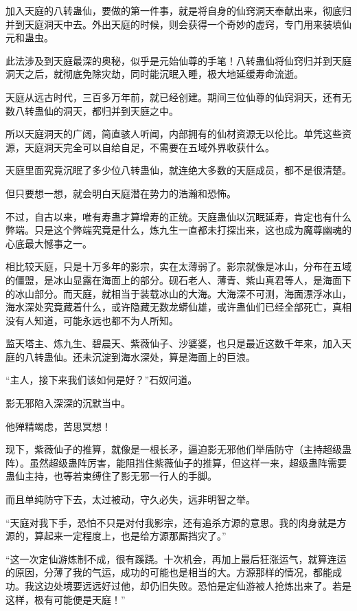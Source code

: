 \begin{this_body}
加入天庭的八转蛊仙，要做的第一件事，就是将自身的仙窍洞天奉献出来，彻底归并到天庭洞天中去。外出天庭的时候，则会获得一个奇妙的虚窍，专门用来装填仙元和蛊虫。

此法涉及到天庭最深的奥秘，似乎是元始仙尊的手笔！八转蛊仙将仙窍归并到天庭洞天之后，就彻底免除灾劫，同时能沉眠入睡，极大地延缓寿命流逝。

天庭从远古时代，三百多万年前，就已经创建。期间三位仙尊的仙窍洞天，还有无数八转蛊仙的洞天，都归并到天庭之中。

所以天庭洞天的广阔，简直骇人听闻，内部拥有的仙材资源无以伦比。单凭这些资源，天庭洞天完全可以自给自足，不需要在五域外界收获什么。

天庭里面究竟沉眠了多少位八转蛊仙，就连绝大多数的天庭成员，都不是很清楚。

但只要想一想，就会明白天庭潜在势力的浩瀚和恐怖。

不过，自古以来，唯有寿蛊才算增寿的正统。天庭蛊仙以沉眠延寿，肯定也有什么弊端。只是这个弊端究竟是什么，炼九生一直都未打探出来，这也成为魔尊幽魂的心底最大憾事之一。

相比较天庭，只是十万多年的影宗，实在太薄弱了。影宗就像是冰山，分布在五域的僵盟，是冰山显露在海面上的部分。砚石老人、薄青、紫山真君等人，是海面下的冰山部分。而天庭，就相当于装载冰山的大海。大海深不可测，海面漂浮冰山，海水深处究竟藏着什么，或许隐藏无数龙蟒仙雄，或许蛊仙们已经全部死亡，真相没有人知道，可能永远也都不为人所知。

监天塔主、炼九生、碧晨天、紫薇仙子、沙婆婆，也只是最近这数千年来，加入天庭的八转蛊仙。还未沉淀到海水深处，算是海面上的巨浪。

“主人，接下来我们该如何是好？”石奴问道。

影无邪陷入深深的沉默当中。

他殚精竭虑，苦思冥想！

现下，紫薇仙子的推算，就像是一根长矛，逼迫影无邪他们举盾防守（主持超级蛊阵）。虽然超级蛊阵厉害，能阻挡住紫薇仙子的推算，但这样一来，超级蛊阵需要蛊仙主持，也等若束缚住了影无邪一行人的手脚。

而且单纯防守下去，太过被动，守久必失，远非明智之举。

“天庭对我下手，恐怕不只是对付我影宗，还有追杀方源的意思。我的肉身就是方源的，算起来一定程度上，也是给方源那厮挡灾了。”

“这一次定仙游炼制不成，很有蹊跷。十次机会，再加上最后狂涨运气，就算连运的原因，分薄了我的气运，成功的可能也是相当的大。方源那样的情况，都能成功。我这边处境要远远好过他，却仍旧失败。恐怕是定仙游被人抢炼出来了。若是这样，极有可能便是天庭！”


\end{this_body}
